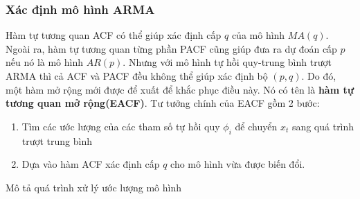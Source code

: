 \documentclass[twoside,12pt]{Latex/Classes/PhDthesisPSnPDF}
\begin{document}
\subsubsection{Xác định mô hình ARMA}
Hàm tự tương quan ACF có thể giúp xác định cấp $q$ của mô hình $MA(q)$. Ngoài ra, hàm tự tương quan từng phần PACF cũng giúp đưa ra dự đoán cấp $p$ nếu nó là mô hình $AR(p)$. Nhưng với mô hình tự hồi quy-trung bình trượt ARMA thì cả ACF và PACF đều không thể giúp xác định bộ $(p,q)$. Do đó, một hàm mở rộng mới được để xuất để khắc phục điều này. Nó có tên là \textbf{hàm tự tương quan mở rộng(EACF)}.
Tư tưởng chính của EACF gồm 2 bước:
\begin{enumerate}
\item Tìm các ước lượng của các tham số tự hồi quy $\phi_i$ để chuyển $x_t$ sang quá trình trượt trung bình
\item Dựa vào hàm ACF xác định cấp $q$ cho mô hình vừa được biến đổi.
\end{enumerate}
Mô tả quá trình xử lý ước lượng mô hình \label{EACFlabel}
\end{document}
